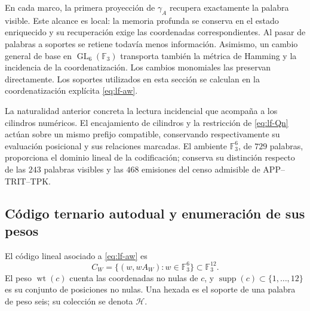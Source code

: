 En cada marco, la primera proyección de \(\gamma_A\) recupera
exactamente la palabra visible. Este alcance es local: la
memoria profunda se conserva en el estado enriquecido y su
recuperación exige las coordenadas correspondientes. Al pasar
de palabras a soportes se retiene todavía menos información.
Asimismo, un cambio general de base en
\(\operatorname{GL}_6(\mathbb F_3)\) transporta también la métrica
de Hamming y la incidencia de la coordenatización. Los cambios monomiales
las preservan directamente. Los soportes utilizados en esta
sección se calculan en la coordenatización explícita \eqref{eq:lf-aw}.

La naturalidad anterior concreta la lectura incidencial que
acompaña a los cilindros numéricos. El encajamiento de cilindros
y la restricción de \eqref{eq:lf-Qn} actúan sobre un mismo
prefijo compatible, conservando respectivamente su evaluación
posicional y sus relaciones marcadas. El ambiente
\(\mathbb F_3^6\), de \(729\) palabras, proporciona el dominio
lineal de la codificación; conserva su distinción respecto de
las \(243\) palabras visibles y las \(468\) emisiones del censo
admisible de APP--TRIT--TPK.

\subsection{Código ternario autodual y enumeración de sus pesos}
\label{subsec:lf-code}

\begin{definition}
El código lineal asociado a \eqref{eq:lf-aw} es
\[
 C_W=\{(w,wA_W):w\in\mathbb F_3^6\}\subset\mathbb F_3^{12}.
\]
El peso \(\operatorname{wt}(c)\) cuenta las coordenadas no nulas
de \(c\), y \(\operatorname{supp}(c)\subset\{1,\ldots,12\}\)
es su conjunto de posiciones no nulas. Una hexada es el soporte
de una palabra de peso seis; su colección se denota \(\mathcal H\).
\end{definition}

